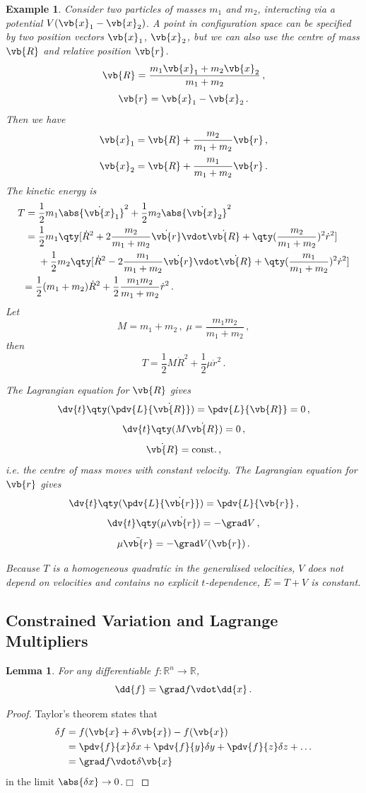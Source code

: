 \documentclass{article}
\theoremstyle{plain}\theoremheaderfont{\normalfont\itshape}\theorembodyfont{\rmfamily}\theoremseparator{.}\newtheorem*{rem}{Remark}\newtheorem*{ex}{Example}\newtheorem*{proof}{Proof}\newtheorem*{altp}{Alternative proof}
\theoremstyle{plain}\theoremheaderfont{\normalfont\bfseries}\theorembodyfont{\rmfamily}\theoremseparator{.}\newtheorem{thm}{Theorem}[section]\newtheorem{lem}[thm]{Lemma}\newtheorem{prop}[thm]{Proposition}\newtheorem*{cor}{Corollary}\newtheorem{defn}[thm]{Definition}\newtheorem{clm}[thm]{Claim}\newtheorem{clminproof}{Claim}
\theoremstyle{break}\theoremheaderfont{\normalfont\itshape}\theorembodyfont{\rmfamily}\theoremseparator{.\medskip}\newtheorem*{proofskip}{Proof}\newtheorem*{exs}{Examples}\newtheorem*{rems}{Remarks}
\theoremstyle{break}\theoremheaderfont{\normalfont\bfseries}\theorembodyfont{\rmfamily}\theoremseparator{.\medskip}\newtheorem{lemskip}[thm]{Lemma}\newtheorem{defnskip}[thm]{Definition}\newtheorem{propskip}[thm]{Proposition}\newtheorem{thmskip}[thm]{Theorem}
\numberwithin{equation}{section}
\newcommand{\qed}{\hfill\ensuremath{\Box}}
\begin{document}
	\begin{ex}
		Consider two particles of masses \(m_1\) and \(m_2\), interacting via a potential \(V(\vb{x}_1-\vb{x}_2)\). A point in configuration space can be specified by two position vectors \(\vb{x}_1\), \(\vb{x}_2\), but we can also use the centre of mass \(\vb{R}\) and relative position \(\vb{r}\).
		\[\vb{R}=\frac{m_1\vb{x}_1+m_2\vb{x}_2}{m_1+m_2}\,,\]
		\[\vb{r}=\vb{x}_1-\vb{x}_2\,.\]
		Then we have
		\[\vb{x}_1=\vb{R}+\frac{m_2}{m_1+m_2}\vb{r}\,,\]
		\[\vb{x}_2=\vb{R}+\frac{m_1}{m_1+m_2}\vb{r}\,.\]
		The kinetic energy is
		\begin{align*}
			T=&\;\frac{1}{2}m_1\abs{\dot{\vb{x}}_1}^2+\frac{1}{2}m_2\abs{\dot{\vb{x}}_2}^2\\
			=&\;\frac{1}{2}m_1\qty[\dot{R}^2+2\frac{m_2}{m_1+m_2}\dot{\vb{r}}\vdot\dot{\vb{R}}+\qty(\frac{m_2}{m_1+m_2})^2\dot{r}^2]\\
			&\;+\frac{1}{2}m_2\qty[\dot{R}^2-2\frac{m_1}{m_1+m_2}\dot{\vb{r}}\vdot\dot{\vb{R}}+\qty(\frac{m_1}{m_1+m_2})^2\dot{r}^2]\\
			=\;&\frac{1}{2}(m_1+m_2)\dot{R}^2+\frac{1}{2}\frac{m_1m_2}{m_1+m_2}\dot{r}^2\,.
		\end{align*}
		Let
		\[M=m_1+m_2\,,\;\mu=\frac{m_1m_2}{m_1+m_2}\,,\]
		then
		\[T=\frac{1}{2}M\dot{R}^2+\frac{1}{2}\mu\dot{r}^2\,.\]
		
		The Lagrangian equation for \(\vb{R}\) gives
		\[\dv{t}\qty(\pdv{L}{\dot{\vb{R}}})=\pdv{L}{\vb{R}}=0\,,\]
		\[\dv{t}\qty(M\dot{\vb{R}})=0\,,\]
		\[\dot{\vb{R}}=\text{const.}\,,\]
		i.e. the centre of mass moves with constant velocity. The Lagrangian equation for \(\vb{r}\) gives
		\[\dv{t}\qty(\pdv{L}{\dot{\vb{r}}})=\pdv{L}{\vb{r}}\,,\]
		\[\dv{t}\qty(\mu\dot{\vb{r}})=-\grad V\,,\]
		\[\mu\ddot{\vb{r}}=-\grad V(\vb{r})\,.\]

		Because \(T\) is a homogeneous quadratic in the generalised velocities, \(V\) does not depend on velocities and contains no explicit \(t\)-dependence, \(E=T+V\) is constant.
	\end{ex}

	\subsection{Constrained Variation and Lagrange Multipliers}
	\begin{lem}
		For any differentiable \(f:\mathbb{R}^n\to\mathbb{R}\),
		\[\dd{f}=\grad f\vdot\dd{x}\,.\]
	\end{lem}
	\begin{proof}
		Taylor's theorem states that
		\begin{align*}
			\delta f&=f(\vb{x}+\delta\vb{x})-f(\vb{x})\\
			&=\pdv{f}{x}\delta x+\pdv{f}{y}\delta y+\pdv{f}{z}\delta z+\dots\\
			&=\grad f\vdot\delta\vb{x}
		\end{align*}
		in the limit \(\abs{\delta x}\to 0\).\qed
	\end{proof}
\end{document}

